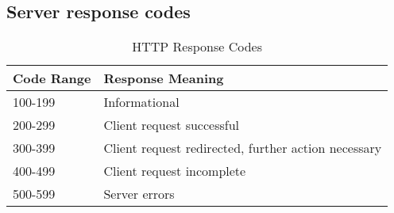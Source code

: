 \documentclass[a4paper]{article}
\begin{document}
\subsection{Server response codes}

\begin{table}[h]
  \centering
  \begin{tabular}{ll}
	\hline \textbf{Code Range} & \textbf{Response Meaning}\\\hline
	100-199 & Informational \\
	200-299 & Client request successful\\
	300-399 & Client request redirected, further action necessary\\
	400-499 & Client request incomplete \\
	500-599 & Server errors\\ \hline
  \end{tabular}
  \caption{HTTP Response Codes}
  \label{tab:http.res.code}
\end{table}
\end{document}
